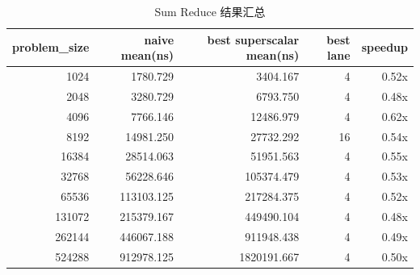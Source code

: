\begin{table}[H]
\centering
\caption{Sum Reduce 结果汇总}
\label{tab:sum_reduce_before_fix_results}
\small
\begin{tabular}{r r r r r}
\toprule
problem\_size & naive mean(ns) & best superscalar mean(ns) & best lane & speedup \\
\midrule
1024 & 1780.729 & 3404.167 & 4 & 0.52x \\
2048 & 3280.729 & 6793.750 & 4 & 0.48x \\
4096 & 7766.146 & 12486.979 & 4 & 0.62x \\
8192 & 14981.250 & 27732.292 & 16 & 0.54x \\
16384 & 28514.063 & 51951.563 & 4 & 0.55x \\
32768 & 56228.646 & 105374.479 & 4 & 0.53x \\
65536 & 113103.125 & 217284.375 & 4 & 0.52x \\
131072 & 215379.167 & 449490.104 & 4 & 0.48x \\
262144 & 446067.188 & 911948.438 & 4 & 0.49x \\
524288 & 912978.125 & 1820191.667 & 4 & 0.50x \\
\bottomrule
\end{tabular}
\end{table}
